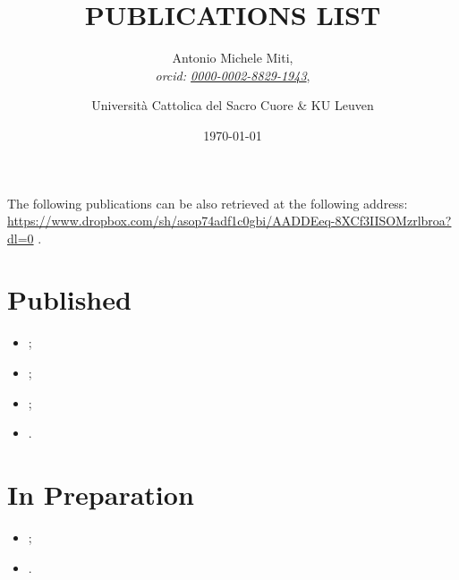\documentclass{article}
\title{PUBLICATIONS LIST}
\date{\today}
\author{
	Antonio Michele Miti,\\
	\emph{orcid: \href{https://orcid.org/0000-0002-8829-1943}{0000-0002-8829-1943}},
	\and 
	Università Cattolica del Sacro Cuore \& KU Leuven
}
\begin{document}
  

	\maketitle

	\noindent
  The following publications can be also retrieved at the following address:
  \\ 
  \url{https://www.dropbox.com/sh/asop74adf1c0gbi/AADDEeq-8XCf3IISOMzrlbroa?dl=0}
  .


  \section*{Published}
	  \begin{itemize}
 	   \item {};
 	   \item {};
 	   \item {};
 	   \item {}.
	  \end{itemize}




  
  \section*{In Preparation}
	  \begin{itemize}
 	   \item {};
 	   \item {}.
	  \end{itemize}

  
\end{document}
